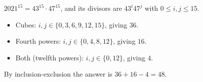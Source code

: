 $2021^{15}=43^{15}\cdot47^{15}$, and its divisors are $43^i47^j$ with $0\le i,j\le15$.
\begin{itemize}
\item Cubes: $i,j\in\{0,3,6,9,12,15\}$, giving $36$.
\item Fourth powers: $i,j\in\{0,4,8,12\}$, giving $16$.
\item Both (twelfth powers): $i,j\in\{0,12\}$, giving $4$.
\end{itemize}
By inclusion-exclusion the answer is $36+16-4=\boxed{48}$.
